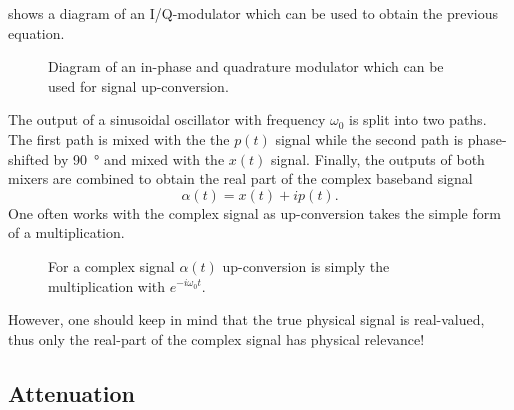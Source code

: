  shows a diagram of an I/Q-modulator which can be used to obtain the previous equation.
\begin{figure}[htb]
	\centering
	
	\caption{Diagram of an in-phase and quadrature modulator which can be used for signal up-conversion.}\label{fig:iqmod}
\end{figure}
The output of a sinusoidal oscillator with frequency $\omega_0$ is split into two paths.
The first path is mixed with the the $p(t)$ signal while the second path is phase-shifted by \SI{90}{\degree} and mixed with the $x(t)$ signal.
Finally, the outputs of both mixers are combined to obtain the real part of the complex baseband signal
\begin{equation}
	\alpha(t)
	=
	x(t)
	+
	ip(t)
	.
\end{equation}
One often works with the complex signal as up-conversion takes the simple form of a multiplication.
\begin{figure}[htb]
	\centering
	
	\caption{For a complex signal $\alpha(t)$ up-conversion is simply the multiplication with $e^{-i\omega_0t}$.}
\end{figure}
However, one should keep in mind that the true physical signal is real-valued, thus only the real-part of the complex signal has physical relevance!

\subsection{Attenuation}
